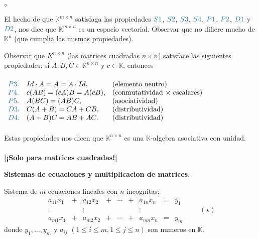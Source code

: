 \documentclass{article}
\theoremstyle{definition}
\theoremstyle{definition}
\theoremstyle{remark}
\begin{document}
\begin{list}{$\circ$}{}  
\item El hecho de que $\mathbb{K}^{m \times n}$ satisfaga las propiedades $\textcolor{azulp2}{S1}$, $\textcolor{azulp2}{S2}$, $\textcolor{azulp2}{S3}$, $\textcolor{azulp2}{S4}$, $\textcolor{azulp2}{P1}$, $\textcolor{azulp2}{P2}$, $\textcolor{azulp2}{D1}$ y $\textcolor{azulp2}{D2}$, nos dice que $\mathbb{K}^{m \times n}$ es un espacio vectorial. Observar que no difiere mucho de $\mathbb{K}^{n}$ (que cumplia las mismas propiedades).
\item Observar que $K^{n \times n}$ (las matrices cuadradas $n \times n$) satisface las siguientes propiedades: si $A,B,C \in \mathbb{K}^{n \times n}$ y $c \in \mathbb{K}$, entonces \\\\
  $\begin{array}{lll} 
    \textcolor{azulp2}{P3.} & Id\cdot A=A=A\cdot Id, & \text{(elemento neutro)}\\
    \textcolor{azulp2}{P4.} & c(AB)=(cA)B=A(cB), & \text{(conmutatividad $\times$ escalares)} \\
    \textcolor{azulp2}{P5.} & A(BC)=(AB)C, & \text{(asociatividad)} \\
    \textcolor{azulp2}{D3.} & C(A+B)=CA+CB, & \text{(distributividad)}\\
    \textcolor{azulp2}{D4.} & (A+B)C=AB+AC. & \text{(distributividad)}
  \end{array}$\\\\
  Estas propiedades nos dicen que $\mathbb{K}^{n \times n}$ es una $\mathbb{K}$-algebra asociativa con unidad.\\\\
  \textbf{[¡Solo para matrices cuadradas!]}
\end{list}
\begin{center}
\textbf{Sistemas de ecuaciones y multiplicacion de matrices.}
\end{center}
Sistema de $m$ ecuaciones lineales con $n$ incognitas: \[
  \begin{matrix}
  a_{11}x_{1} & + & a_{12}x_{2} & + & \cdots & + & a_{1n}x_n & = & y_1 \\ 
  \vdots & & \vdots  & & & & \vdots & & \\
  a_{m1}x_{1} & + & a_{m2}x_2 & + & \cdots & + & a_{mn}x_{n} & = & y_{m}
\end{matrix}\quad \quad (\star)
\]
donde $y_1, \dots,y_m$ y $a_{ij}$ $(1 \leq i \leq m, 1 \leq j \leq n)$ son numeros en $\mathbb{K}$.\\\\
\end{document}
